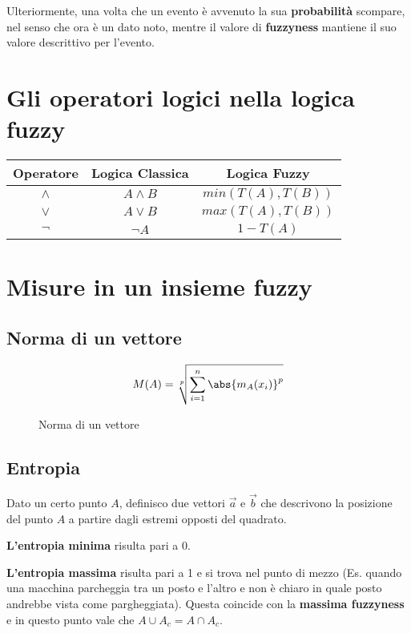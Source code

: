 \documentclass[\main/main.tex]{subfiles}
\begin{document}
Ulteriormente, una volta che un evento è avvenuto la sua \textbf{probabilità} scompare, nel senso che ora è un dato noto, mentre il valore di \textbf{fuzzyness} mantiene il suo valore descrittivo per l'evento.

\section{Gli operatori logici nella logica fuzzy}

\begin{center}
	\begin{tabular}{ |c|c|c| }
		\hline
		Operatore & Logica Classica & Logica Fuzzy      \\
		\hline
		$\wedge$  & $A \wedge B$    & $min(T(A), T(B))$ \\
		\hline
		$\vee$    & $A \vee B$      & $max(T(A), T(B))$ \\
		\hline
		$ \neg$   & $\neg A$        & $1 - T(A)$        \\
		\hline
	\end{tabular}
\end{center}

\section{Misure in un insieme fuzzy}

\subsection{Norma di un vettore}

\begin{figure}[H]
	\[
		M(A) = \sqrt[p]{\sum_{i=1}^{n} \abs{m_A(x_i)}^p}
	\]
	\caption{Norma di un vettore}
\end{figure}

\subsection{Entropia}
Dato un certo punto $A$, definisco due vettori $\vec{a}$ e $\vec{b}$ che descrivono la posizione del punto $A$ a partire dagli estremi opposti del quadrato.

\textbf{L'entropia minima} risulta pari a 0.

\textbf{L'entropia massima} risulta pari a 1 e si trova nel punto di mezzo (Es. quando una macchina parcheggia tra un posto e l'altro e non è chiaro in quale posto andrebbe vista come pargheggiata). Questa coincide con la \textbf{massima fuzzyness} e in questo punto vale che $A \cup A_c = A \cap A_c$.
\end{document}
